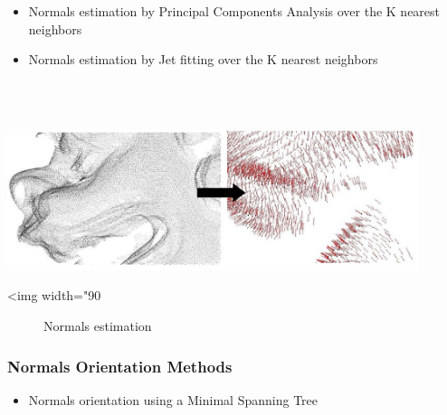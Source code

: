 \begin{itemize}
\item Normals estimation by Principal Components Analysis over the K nearest neighbors
\item Normals estimation by Jet fitting over the K nearest neighbors
\end{itemize}

  \\
  \\

\begin{center}
    \label{Surface_reconstruction_3-fig-normal_estimation_pca}
    \begin{ccTexOnly}
        \includegraphics[width=0.9\textwidth]{Surface_reconstruction_3/normal_estimation_pca} %
    \end{ccTexOnly}
    \begin{ccHtmlOnly}
        <img width="90%
    \end{ccHtmlOnly}
    \begin{figure}[h]
        \caption{Normals estimation}
    \end{figure}
\end{center}


\subsubsection{Normals Orientation Methods}

\begin{itemize}
\item Normals orientation using a Minimal Spanning Tree \cite{cgal:hddms-srup-92}
\end{itemize}

  \\

